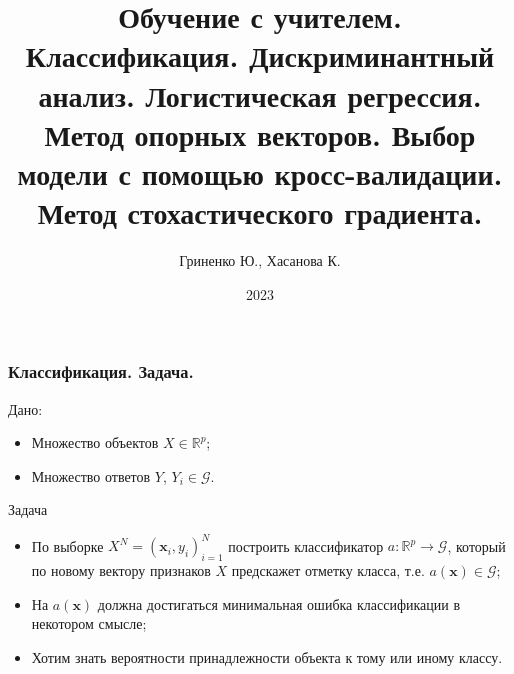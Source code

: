 \documentclass[11pt]{beamer}
\begin{document}
	\author{Гриненко Ю., Хасанова К.}
	\title[Статистическое и машинное обучение] {Обучение с учителем. Классификация. Дискриминантный анализ. Логистическая регрессия. Метод опорных векторов. Выбор модели с помощью кросс-валидации. Метод стохастического градиента.}
	\date{2023}
	\subject{Семинар по статистическому и машинному обучению}
	\begin{frame}[plain]
		\maketitle 
	\end{frame}
	
	
	\begin{frame}
		\frametitle{Классификация. Задача.}
		
		Дано:
		\begin{itemize}
			\item Множество объектов $X \in \mathbb{R}^p$;
			\item Множество ответов $Y$, $Y_i \in \mathcal{G}$.
		\end{itemize}
		Задача
		\begin{itemize}
			\item По выборке $X^N = (\mathbf{x}_i, y_i)_{i = 1}^N$ построить классификатор $a: \mathbb{R}^p \rightarrow \mathcal{G}$, который по новому вектору признаков $X$ предскажет отметку класса, т.е. $a(\mathbf{x}) \in \mathcal{G}$;
			\item На $a(\mathbf{x})$ должна достигаться минимальная ошибка классификации в некотором смысле;
			\item Хотим знать вероятности принадлежности объекта к тому или иному классу.
		\end{itemize}
	
	\end{frame}
	
\end{document}
